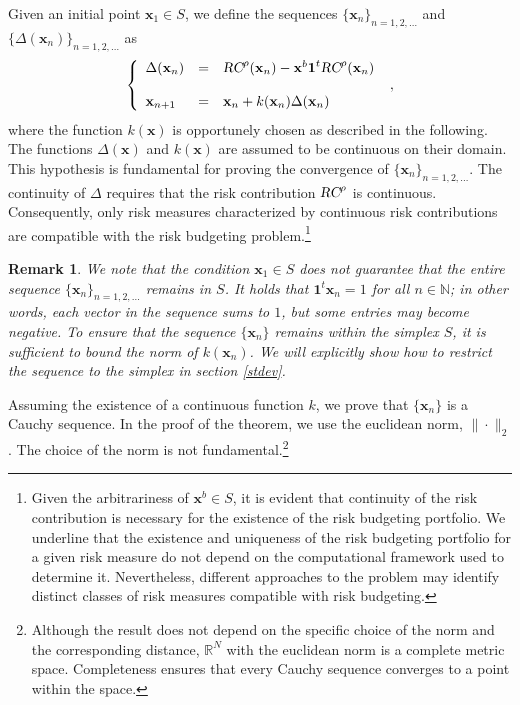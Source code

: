 \documentclass[preprint,11pt,authoryear]{elsarticle}
\newtheorem{remark}{Remark}%
\begin{document}
Given an initial point $\mathbf{x}_1 \in S$, we define the sequences $\{\mathbf{x}_n\}_{n=1,2,\dots}$ and $\{\Delta(\mathbf x_n)\}_{n=1,2,\dots}$ as 
\begin{eqnarray} \label{succ}
\left \{ \begin{array}{lcl}
\Delta( \mathbf{x}_n )&=& \textsl{RC}^{\rho}(\mathbf{x}_n)  - \mathbf{x}^b \textbf{1}^t \textsl{RC}^{\rho}(\mathbf{x}_n) \\ \\ 
\mathbf{x}_{n+1} &=& \mathbf{x}_n + k(\mathbf{x}_n) \Delta( \mathbf{x}_n) 
\end{array} \right . \ ,
\end{eqnarray}
where the function $k(\mathbf{x})$ is opportunely chosen as described in the following. The functions $\Delta(\mathbf{x})$ and $k(\mathbf{x})$ are assumed to be continuous on their domain. This hypothesis is fundamental for proving the convergence of $\{\mathbf{x}_n\}_{n=1,2,\dots}$. The continuity of $\Delta$ requires that the risk contribution $\textsl{RC}^{\rho}$ is continuous. Consequently, only risk measures characterized by continuous risk contributions are compatible with the risk budgeting problem.\footnote{Given the arbitrariness of $\mathbf{x}^b \in S$, it is evident that continuity of the risk contribution is necessary for the existence of the risk budgeting portfolio. We underline that the existence and uniqueness of the risk budgeting portfolio for a given risk measure do not depend on the computational framework used to determine it. Nevertheless, different approaches to the problem may identify distinct classes of risk measures compatible with risk budgeting.} 
\begin{remark}
We note that the condition $\mathbf{x}_1 \in S$ does not guarantee that the entire sequence $\{\mathbf{x}_n\}_{n=1,2,\dots}$ remains in $S$. It holds that $\textbf{1}^t \mathbf{x}_n = 1$ for all $n \in \mathbb{N}$; in other words, each vector in the sequence sums to $1$,  but some entries may become negative. To ensure that the sequence $\{\mathbf{x}_n\}$ remains within the simplex $S$, it is sufficient to bound the norm of $k(\mathbf{x}_n)$. We will explicitly show how to restrict the sequence to the simplex in section \ref{stdev}.  
\end{remark}
Assuming the existence of a continuous function $k$, we prove that $\{\mathbf{x}_n\}$ is a Cauchy sequence. In the proof of the theorem, we use the euclidean norm, $\|\cdot\|_2$. The choice of the norm is not fundamental.\footnote{Although the result does not depend on the specific choice of the norm and the corresponding distance, $\mathbb R^N$ with the euclidean norm is a complete metric space. Completeness ensures that every Cauchy sequence converges to a point within the space.} 
\end{document}
